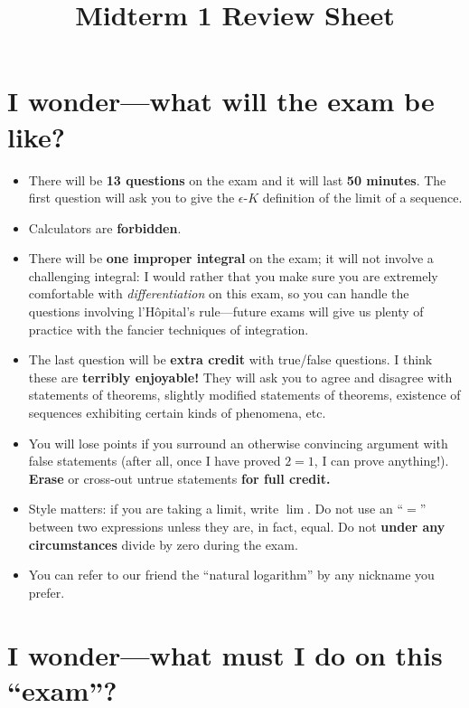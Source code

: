 \documentclass[12pt]{article}
\title{Midterm 1 Review Sheet}
\theoremstyle{definition}
\begin{document}
\section*{I wonder---what will the exam be like?}

\begin{itemize}
\item There will be \textbf{13 questions} on the exam and it will last
  \textbf{50 minutes}.  The first question will ask you to give the
  $\epsilon$-$K$ definition of the limit of a sequence.

\item Calculators are \textbf{forbidden}.

\item There will be \textbf{one improper integral} on the exam; it
  will not involve a challenging integral: I would rather that you
  make sure you are extremely comfortable with
  \textit{differentiation} on this exam, so you can handle the
  questions involving l'H\^opital's rule---future exams will give us
  plenty of practice with the fancier techniques of integration.

\item The last question will be \textbf{extra credit} with true/false
  questions.  I think these are \textbf{terribly enjoyable!}  They
  will ask you to agree and disagree with statements of theorems,
  slightly modified statements of theorems, existence of sequences
  exhibiting certain kinds of phenomena, etc.

\item You will lose points if you surround an otherwise convincing
  argument with false statements (after all, once I have proved $2 =
  1$, I can prove anything!).  \textbf{Erase} or cross-out untrue
  statements \textbf{for full credit.}

\item Style matters: if you are taking a limit, write $\lim$.  Do not
  use an ``$=$'' between two expressions unless they are, in fact,
  equal.  Do not \textbf{under any circumstances} divide by zero
  during the exam.

\item You can refer to our friend the ``natural logarithm'' by any
  nickname you prefer.
\end{itemize}

\section*{I wonder---what must I do on this ``exam''?}
\end{document}
